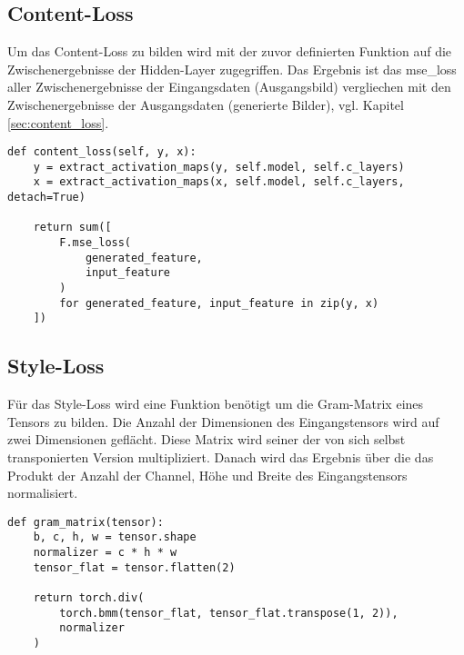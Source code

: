 \pagebreak

\subsection{Content-Loss}

Um das Content-Loss zu bilden wird mit der zuvor definierten Funktion auf die Zwischenergebnisse der Hidden-Layer zugegriffen.
Das Ergebnis ist das \gls{mse_loss} aller Zwischenergebnisse der Eingangsdaten (Ausgangsbild) vergliechen mit den Zwischenergebnisse der Ausgangsdaten (generierte Bilder), vgl. Kapitel \ref{sec:content_loss}.

\begin{listing}[ht]
\begin{verbatim}
def content_loss(self, y, x):
    y = extract_activation_maps(y, self.model, self.c_layers)
    x = extract_activation_maps(x, self.model, self.c_layers, detach=True)

    return sum([
        F.mse_loss(
            generated_feature,
            input_feature
        )
        for generated_feature, input_feature in zip(y, x)
    ])
\end{verbatim}
\end{listing}

\subsection{Style-Loss}

Für das Style-Loss wird eine Funktion benötigt um die Gram-Matrix eines Tensors zu bilden. Die Anzahl der Dimensionen des Eingangstensors wird auf zwei Dimensionen geflächt. Diese Matrix wird seiner der von sich selbst transponierten Version multipliziert. Danach wird das Ergebnis über die das Produkt der Anzahl der Channel, Höhe und Breite des Eingangstensors normalisiert.

\begin{listing}[ht]
\begin{verbatim}
def gram_matrix(tensor):
    b, c, h, w = tensor.shape
    normalizer = c * h * w
    tensor_flat = tensor.flatten(2)

    return torch.div(
        torch.bmm(tensor_flat, tensor_flat.transpose(1, 2)),
        normalizer
    )
\end{verbatim}
\end{listing}

